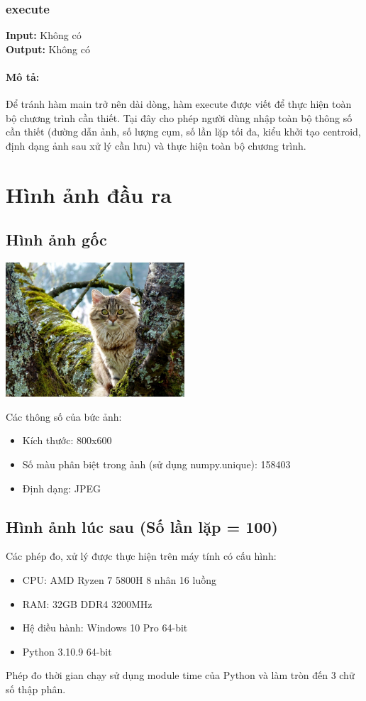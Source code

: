 \documentclass{article}
\begin{document}
\subsubsection{execute}
\textbf{Input:} Không có \\
\textbf{Output:} Không có

\paragraph{Mô tả:}
Để tránh hàm main trở nên dài dòng, hàm execute được viết để thực hiện toàn bộ chương trình cần thiết. Tại đây cho phép người dùng nhập toàn bộ thông số cần thiết (đường dẫn ảnh, số lượng cụm, số lần lặp tối đa, kiểu khởi tạo centroid, định dạng ảnh sau xử lý cần lưu) và thực hiện toàn bộ chương trình.

\section{Hình ảnh đầu ra}
\subsection{Hình ảnh gốc}
\centerline{\includegraphics[width=0.5\textwidth]{image/cat.jpg}}
Các thông số của bức ảnh:
\begin{itemize}
    \item Kích thước: 800x600
    \item Số màu phân biệt trong ảnh (sử dụng numpy.unique): 158403
    \item Định dạng: JPEG
\end{itemize}

\subsection{Hình ảnh lúc sau (Số lần lặp = 100)}
Các phép đo, xử lý được thực hiện trên máy tính có cấu hình:
\begin{itemize}
    \item CPU: AMD Ryzen 7 5800H 8 nhân 16 luồng
    \item RAM: 32GB DDR4 3200MHz
    \item Hệ điều hành: Windows 10 Pro 64-bit
    \item Python 3.10.9 64-bit
\end{itemize}
Phép đo thời gian chạy sử dụng module time của Python và làm tròn đến 3 chữ số thập phân.
\end{document}
